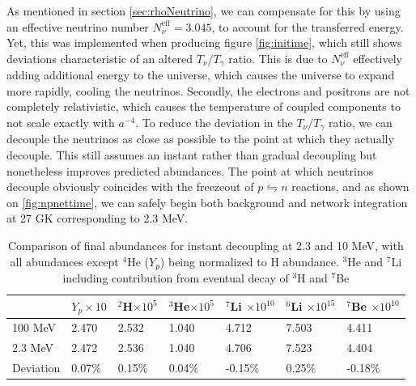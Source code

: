 As mentioned in section \ref{sec:rhoNeutrino}, we can compensate for this by using an effective neutrino number $N_\nu^\text{eff}=3.045$, to account for the transferred energy. Yet, this was implemented when producing figure \ref{fig:initime}, which still shows deviations characteristic of an altered $T_\nu/T_\gamma$ ratio. This is due to $N_\nu^\text{eff}$ effectively adding additional energy to the universe, which causes the universe to expand more rapidly, cooling the neutrinos. Secondly, the electrons and positrons are not completely relativistic, which causes the temperature of coupled components to not scale exactly with $a^{-4}$. To reduce the deviation in the $T_\nu/T_\gamma$ ratio, we can decouple the neutrinos as close as possible to the point at which they actually decouple. This still assumes an instant rather than gradual decoupling but nonetheless improves predicted abundances. The point at which neutrinos decouple obviously coincides with the freezeout of $p\leftrightharpoons n$ reactions, and as shown on \ref{fig:npnettime}, we can safely begin both background and network integration at 27 GK corresponding to 2.3 MeV. 
\begin{table}[ht]
    \begin{tabular}{l|llllll}
        & $Y_p \times 10$ & \hspace{-0.34em}$^{2}$H$ \times 10^{5}$ & \hspace{-0.34em}$^{3}$He$ \times 10^{5}$ & \hspace{-0.34em}$^{7}$Li $ \times 10^{10}$& \hspace{-0.34em}$^{6}$Li $ \times 10^{15}$& \hspace{-0.34em}$^{7}$Be $ \times 10^{10}$\\ \hline
    100 MeV & 2.470            & 2.532 & 1.040 & 4.712 & 7.503 & 4.411     \\ \hline
    2.3 MeV  & 2.472            & 2.536 & 1.040 & 4.706 & 7.523 & 4.404   \\ \hline
    Deviation & 0.07\%           & 0.15\% & 0.04\% & -0.15\% & 0.25\% & -0.18\%      
    \end{tabular}
    \caption{Comparison of final abundances for instant decoupling at 2.3 and 10 MeV, with all abundances except ${}^4$He ($Y_p$) being normalized to H abundance. ${}^3$He and ${}^7$Li including contribution from eventual decay of ${}^3$H and ${}^7$Be}
    \label{tab:earlylatedecoup}
\end{table}
